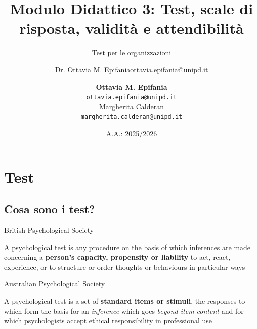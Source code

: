 \documentclass[compress]{beamer}
\title[Misura in $\psi$]{Modulo Didattico 3: Test, scale di risposta, validità e attendibilità}
\subtitle{Test per le organizzazioni}
\date{A.A.: 2025/2026}
\author[Ottavia Epifania]{\texorpdfstring{Dr. Ottavia M. Epifania\newline\url{ottavia.epifania@unipd.it}}{Author}}
\institute[]{Università di Padova}
\author{\textbf{Ottavia M. Epifania}\\\texttt{ottavia.epifania@unipd.it}\\
Margherita Calderan\\\texttt{margherita.calderan@unipd.it}}
\begin{document}
\begin{frame}[plain]
\maketitle
\end{frame}

	\section{Test}

\subsection{Cosa sono i test?}

\begin{frame}
	
	\begin{block}{British Psychological Society}
		
		A psychological test is any procedure on the basis of which inferences are made concerning a \textbf{person's capacity, propensity or liability} to act, react, experience, or to structure or order thoughts or behaviours in particular ways
	\end{block}
	
	\begin{block}{Australian Psychological Society}
		
		A psychological test is a set of \textbf{standard items or stimuli}, the \alert{responses to which form the basis} for an \emph{inference} which goes \emph{beyond item content} and for which psychologists accept \alert{ethical responsibility} in professional use
	\end{block}
	
\end{frame}
\end{document}
